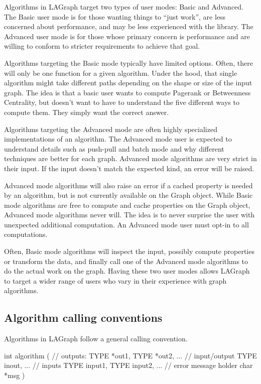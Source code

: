 Algorithms in LAGraph target two types of user modes: Basic and Advanced. The Basic user mode is for those wanting
things to ``just work'', are less concerned about performance, and may be less experienced with the library.
The Advanced user mode is for those whose primary concern is performance and are willing to conform to stricter
requirements to achieve that goal.

Algorithms targeting the Basic mode typically have limited options. Often, there will only be one function for
a given algorithm. Under the hood, that single algorithm might take different paths depending on the shape or
size of the input graph. The idea is that a basic user wants to compute Pagerank or Betweenness Centrality,
but doesn't want to have to understand the five different ways to compute them. They simply want the correct answer.

Algorithms targeting the Advanced mode are often highly specialized implementations of an algorithm. The Advanced
mode user is expected to understand details such as push-pull and batch mode and why different techniques are
better for each graph. Advanced mode algorithms are very strict in their input. If the input doesn't match the
expected kind, an error will be raised.

Advanced mode algorithms will also raise an error if a cached property is needed by an algorithm, but is not
currently available on the Graph object. While Basic mode algorithms are free to compute and cache properties
on the Graph object, Advanced mode algorithms never will. The idea is to never surprise the user with unexpected
additional computation. An Advanced mode user must opt-in to all computations.

Often, Basic mode algorithms will inspect the input, possibly compute properties or transform the data,
and finally call one of the Advanced mode algorithms to do the actual work on the graph. Having these two user
modes allows LAGraph to target a wider range of users who vary in their experience with graph algorithms.


\subsection{Algorithm calling conventions}

Algorithms in LAGraph follow a general calling convention.

\begin{cplus}
int algorithm
(
    // outputs:
    TYPE *out1,
    TYPE *out2,
    ...
    // input/output
    TYPE inout,
    ...
    // inputs
    TYPE input1,
    TYPE input2,
    ...
    // error message holder
    char *msg
)
\end{cplus}

